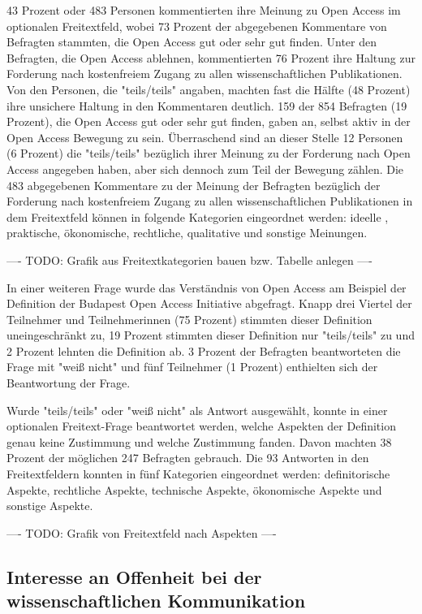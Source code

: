 43 Prozent oder 483 Personen kommentierten ihre Meinung zu Open Access im optionalen Freitextfeld, wobei 73 Prozent der abgegebenen Kommentare von Befragten stammten, die Open Access gut oder sehr gut finden. Unter den Befragten, die Open Access ablehnen, kommentierten 76 Prozent ihre Haltung zur Forderung nach kostenfreiem Zugang zu allen wissenschaftlichen Publikationen. Von den Personen, die "teils/teils" angaben, machten fast die Hälfte (48 Prozent) ihre unsichere Haltung in den Kommentaren deutlich. 159 der 854 Befragten (19 Prozent), die Open Access gut oder sehr gut finden, gaben an, selbst aktiv in der Open Access Bewegung zu sein. Überraschend sind an dieser Stelle 12 Personen (6 Prozent) die "teils/teils" bezüglich ihrer Meinung zu der Forderung nach Open Access angegeben haben, aber sich dennoch zum Teil der Bewegung zählen. Die 483 abgegebenen Kommentare zu der Meinung der Befragten bezüglich der Forderung nach kostenfreiem Zugang zu allen wissenschaftlichen Publikationen in dem Freitextfeld können in folgende Kategorien eingeordnet werden: ideelle , praktische, ökonomische, rechtliche, qualitative und sonstige Meinungen.

---- TODO: Grafik aus Freitextkategorien bauen bzw. Tabelle anlegen  ----

In einer weiteren Frage wurde das Verständnis von Open Access am Beispiel der Definition der Budapest Open Access Initiative \cite{boai_2012} abgefragt. Knapp drei Viertel der Teilnehmer und Teilnehmerinnen (75 Prozent) stimmten dieser Definition uneingeschränkt zu, 19 Prozent stimmten dieser Definition nur "teils/teils" zu und 2 Prozent lehnten die Definition ab. 3 Prozent der Befragten beantworteten die Frage mit "weiß nicht" und fünf Teilnehmer (1 Prozent) enthielten sich der Beantwortung der Frage.

Wurde "teils/teils" oder "weiß nicht" als Antwort ausgewählt, konnte in einer optionalen Freitext-Frage beantwortet werden, welche Aspekten der Definition genau keine Zustimmung und welche Zustimmung fanden. Davon machten 38 Prozent der möglichen 247 Befragten gebrauch. Die 93 Antworten in den Freitextfeldern konnten in fünf Kategorien eingeordnet werden: definitorische Aspekte, rechtliche Aspekte, technische Aspekte, ökonomische Aspekte und sonstige Aspekte.

---- TODO: Grafik von Freitextfeld nach Aspekten ----

\subsection{Interesse an Offenheit bei der wissenschaftlichen Kommunikation}

